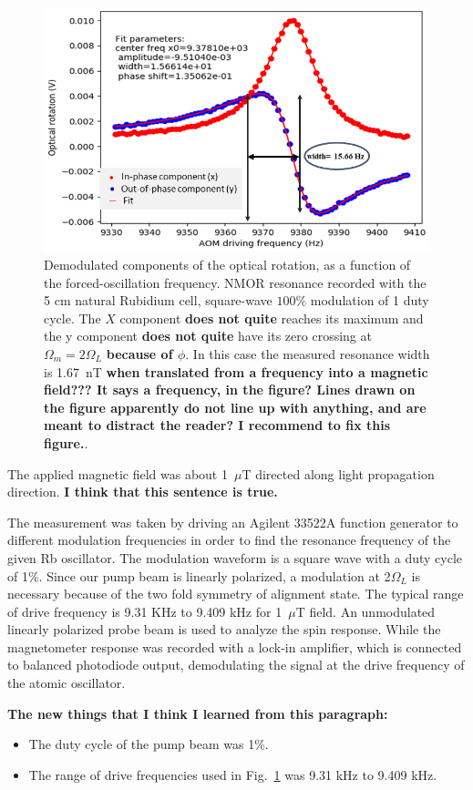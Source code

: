 \begin{figure}[h]
\centering\includegraphics[width=0.5\linewidth]{figures/FM_modulation}
\caption{Demodulated components of the optical rotation, as a function
  of the forced-oscillation frequency.  NMOR resonance recorded with
  the 5 cm natural Rubidium cell, square-wave $100\%$ modulation of 1
  duty cycle. The $X$ component {\bf does not quite} reaches its
  maximum and the y component {\bf does not quite} have its zero
  crossing at $\Omega_m=2\Omega_L$ {\bf because of $\phi$}.  In this
  case the measured resonance width is 1.67~nT {\bf when translated
    from a frequency into a magnetic field???  It says a frequency, in
    the figure?  Lines drawn on the figure apparently do not line up
    with anything, and are meant to distract the
    reader?  I recommend to fix this figure.}.\label{fig:FMOR}}
\end{figure} 

The applied magnetic field was about 1~$\mu$T directed along light
propagation direction.  {\bf I think that this sentence is true.}

The measurement was taken by driving an Agilent 33522A function
generator to different modulation frequencies in order to find the
resonance frequency of the given Rb oscillator. The modulation
waveform is a square wave with a duty cycle of 1\%. Since our pump
beam is linearly polarized, a modulation at 2$\Omega_{L}$ is necessary
because of the two fold symmetry of alignment state. The typical range
of drive frequency is 9.31 KHz to 9.409 kHz for 1~$\mu$T field. An
unmodulated linearly polarized probe beam is used to analyze the spin
response. While the magnetometer response was recorded with a lock-in
amplifier, which is connected to balanced photodiode output,
demodulating the signal at the drive frequency of the atomic
oscillator.

{\bf The new things that I think I learned from this paragraph:}
\begin{itemize}
\item The duty cycle of the pump beam was 1\%.
\item The range of drive frequencies used in Fig.~\ref{fig:FMOR} was
  9.31 kHz to 9.409 kHz.
\end{itemize}


